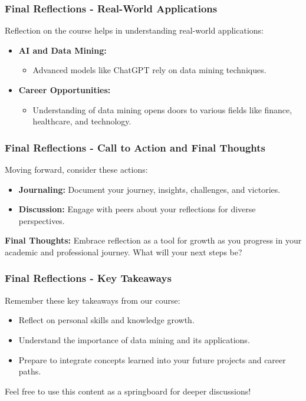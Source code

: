 \documentclass[aspectratio=169]{beamer}
\begin{document}
\begin{frame}[fragile]
    \frametitle{Final Reflections - Real-World Applications}
    Reflection on the course helps in understanding real-world applications:
    \begin{itemize}
        \item \textbf{AI and Data Mining:} 
            \begin{itemize}
                \item Advanced models like ChatGPT rely on data mining techniques.
            \end{itemize}
        \item \textbf{Career Opportunities:}
            \begin{itemize}
                \item Understanding of data mining opens doors to various fields like finance, healthcare, and technology.
            \end{itemize}
    \end{itemize}
\end{frame}

\begin{frame}[fragile]
    \frametitle{Final Reflections - Call to Action and Final Thoughts}
    Moving forward, consider these actions:
    \begin{itemize}
        \item \textbf{Journaling:} Document your journey, insights, challenges, and victories.
        \item \textbf{Discussion:} Engage with peers about your reflections for diverse perspectives.
    \end{itemize}
    
    \textbf{Final Thoughts:} Embrace reflection as a tool for growth as you progress in your academic and professional journey. What will your next steps be?
\end{frame}

\begin{frame}[fragile]
    \frametitle{Final Reflections - Key Takeaways}
    Remember these key takeaways from our course:
    \begin{itemize}
        \item Reflect on personal skills and knowledge growth.
        \item Understand the importance of data mining and its applications.
        \item Prepare to integrate concepts learned into your future projects and career paths.
    \end{itemize}
    
    Feel free to use this content as a springboard for deeper discussions!
\end{frame}
\end{document}
